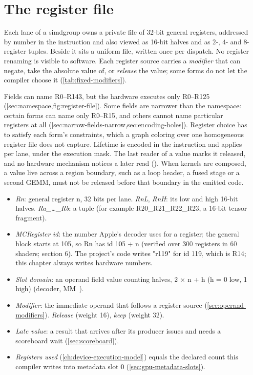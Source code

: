 \chapter{The register file}\label{ch:register-file}

Each lane of a simdgroup owns a private file of 32-bit general registers, addressed by number in the instruction and
also viewed as 16-bit halves and as 2-, 4- and 8-register tuples. Beside it sits a uniform file, written once per
dispatch. No register renaming is visible to software. Each register source carries a \emph{modifier} that can
negate, take the absolute value of, or \emph{release} the value; some forms do not let the compiler choose it
(\cref{tab:fixed-modifiers}).

Fields can name R0–R143, but the hardware executes only R0–R125 (\cref{sec:namespace,fig:register-file}). Some fields are narrower than
the namespace: certain forms can name only R0–R15, and others cannot name particular registers at all
(\cref{sec:narrow-fields-narrow,sec:encoding-holes}). Register choice has to satisfy each form's constraints, which a
graph coloring over one homogeneous register file does not capture. Lifetime is encoded in the instruction and applies
per lane, under the execution mask. The last reader of a value marks it released, and no hardware mechanism notices a
later read (). When kernels are composed, a value
live across a region boundary, such as a loop header, a fused stage or a second GEMM, must not be released before that
boundary in the emitted code.




\begin{itemize}
\item \emph{Rn}: general register n, 32 bits per lane. \emph{RnL}, \emph{RnH}: its low and high 16-bit halves. \emph{Ra\_\dots{}\_Rb}: a tuple
  (for example R20\_R21\_R22\_R23, a 16-bit tensor fragment).
\item \emph{MCRegister id}: the number Apple's decoder uses for a register; the general block starts at 105, so Rn has id
  105 + n (verified over 300 registers in 60 shaders;  section 6). The project's code writes
  "r119" for id 119, which is R14; this chapter always writes hardware numbers.
\item \emph{Slot domain}: an operand field value counting halves, 2 × n + h (h = 0 low, 1 high) (decoder, MM~).
\item \emph{Modifier}: the immediate operand that follows a register source (\cref{sec:operand-modifiers}). \emph{Release} (weight 16), \emph{keep}
  (weight 32).
\item \emph{Late value}: a result that arrives after its producer issues and needs a scoreboard wait (\cref{sec:scoreboard}).
\item \emph{Registers used} (\cref{ch:device-execution-model}) equals the declared count this compiler writes into
  metadata slot 0 (\cref{sec:gpu-metadata-slots}).
\end{itemize}

